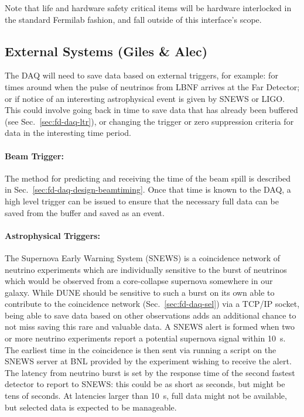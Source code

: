Note that life and hardware safety critical items will be hardware
interlocked in the standard Fermilab fashion, and fall outside of this
interface's scope.


\subsection{External Systems (Giles \& Alec)}
\label{sec:fd-daq-intfc-ext}


The DAQ will need to save data based on external triggers, for
example: for times around when the pulse of neutrinos from LBNF
arrives at the Far Detector; or if notice of an interesting
astrophysical event is given by SNEWS\cite{snews} or LIGO.
This could involve going back in time to save data that has already
been buffered (see Sec.~\ref{sec:fd-daq-ltr}), or changing the trigger
or zero suppression criteria for data in the interesting time period.


\paragraph{Beam Trigger:} The method for predicting and receiving the
time of the beam spill is described in
Sec.~\ref{sec:fd-daq-design-beamtiming}.
Once that time is known to the DAQ, a high level trigger can be issued
to ensure that the necessary full data can be saved from the buffer
and saved as an event.

\paragraph{Astrophysical Triggers:} The Supernova Early Warning System
(SNEWS) is a coincidence network of neutrino experiments which are
individually sensitive to the burst of neutrinos which would be
observed from a core-collapse supernova somewhere in our galaxy.
While DUNE should be sensitive to such a burst on its own able to
contribute to the coincidence network (Sec.~\ref{sec:fd-daq-sel}) via
a TCP/IP socket, being able to save data based on other observations
adds an additional chance to not miss saving this rare and valuable
data.
A SNEWS alert is formed when two or more neutrino experiments report a
potential supernova signal within \SI{10}{\s}.
The earliest time in the coincidence is then sent via running a script
on the SNEWS server at BNL provided by the experiment wishing to
receive the alert.
The latency from neutrino burst is set by the response time of the
second fastest detector to report to SNEWS: this could be as short as
seconds, but might be tens of seconds.
At latencies larger than \SI{10}{\s}, full data might not be
available, but selected data is expected to be manageable.

